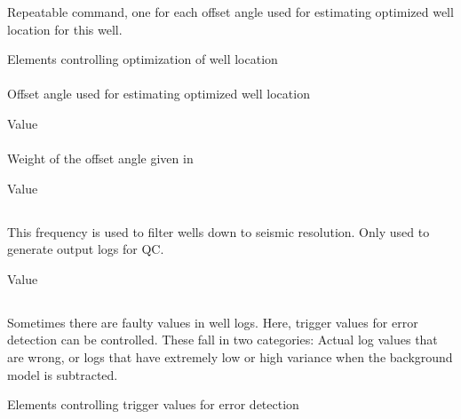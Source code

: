 \subsubsection{}
 \slist
   \item \Description Repeatable command, one for each offset angle used for estimating optimized well location for this well.
   \item \Argument Elements controlling optimization of well location
   \item \Default
 \elist

\paragraph{}
 \slist
    \item \Description Offset angle used for estimating optimized well location
    \item \Argument Value
    \item \Default
 \elist

\paragraph{}
 \slist
    \item \Description Weight of the offset angle given in 
    \item \Argument Value
    \item {}
 \elist

\subsection{}
 \slist
   \item \Description This frequency is used to filter wells down to seismic resolution. Only used to generate output logs for QC.
   \item \Argument Value
   \item \Default
 \elist

\subsection{}
 \slist
   \item \Description Sometimes there are faulty values in well logs. Here, trigger values for error detection can be controlled. These fall in two categories: Actual log values that are wrong, or logs that have extremely low or high variance when the background model is subtracted.
   \item \Argument Elements controlling trigger values for error detection
   \item \Default
 \elist

